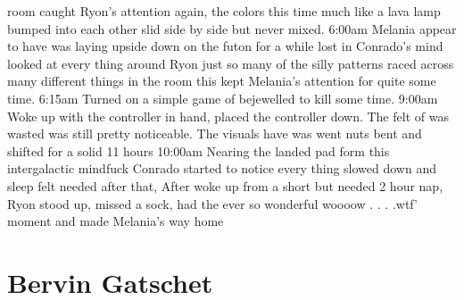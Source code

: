 \documentclass[12pt]{book}
\begin{document}
room caught Ryon's attention again, the colors this time much like a lava lamp bumped into each other slid side by side but never mixed. 6:00am Melania appear to have was laying upside down on the futon for a while lost in Conrado's mind looked at every thing around Ryon just so many of the silly patterns raced across many different things in the room this kept Melania's attention for quite some time. 6:15am Turned on a simple game of bejewelled to kill some time. 9:00am Woke up with the controller in hand, placed the controller down. The felt of was wasted was still pretty noticeable. The visuals have was went nuts bent and shifted for a solid 11 hours 10:00am Nearing the landed pad form this intergalactic mindfuck Conrado started to notice every thing slowed down and sleep felt needed after that, After woke up from a short but needed 2 hour nap, Ryon stood up, missed a sock, had the ever so wonderful woooow . . .  .wtf' moment and made Melania's way home



\chapter{Bervin Gatschet}
\end{document}
